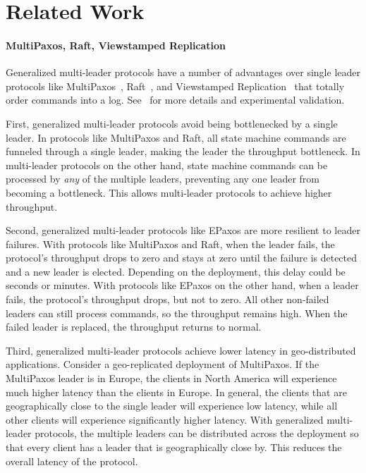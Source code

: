\section{Related Work}
\newcommand{\condensedparagraph}[1]{\textbf{#1}\;}

\paragraph{MultiPaxos, Raft, Viewstamped Replication}

Generalized multi-leader protocols have a number of advantages over single
leader protocols like MultiPaxos~\cite{lamport2001paxos},
Raft~\cite{ongaro2014search}, and Viewstamped
Replication~\cite{liskov2012viewstamped} that totally order commands into a
log. See~\cite{moraru2013there} for more details and experimental validation.

First, generalized multi-leader protocols avoid being bottlenecked by a single
leader. In protocols like MultiPaxos and Raft, all state machine commands are
funneled through a single leader, making the leader the throughput bottleneck.
In multi-leader protocols on the other hand, state machine commands can be
processed by \emph{any} of the multiple leaders, preventing any one leader from
becoming a bottleneck. This allows multi-leader protocols to achieve higher
throughput.

Second, generalized multi-leader protocols like EPaxos are more resilient to
leader failures. With protocols like MultiPaxos and Raft, when the leader
fails, the protocol's throughput drops to zero and stays at zero until the
failure is detected and a new leader is elected. Depending on the deployment,
this delay could be seconds or minutes. With protocols like EPaxos on the other
hand, when a leader fails, the protocol's throughput drops, but not to zero.
All other non-failed leaders can still process commands, so the throughput
remains high. When the failed leader is replaced, the throughput returns to
normal.

Third, generalized multi-leader protocols achieve lower latency in
geo-distributed applications. Consider a geo-replicated deployment of
MultiPaxos. If the MultiPaxos leader is in Europe, the clients in North America
will experience much higher latency than the clients in Europe. In general, the
clients that are geographically close to the single leader will experience low
latency, while all other clients will experience significantly higher latency.
With generalized multi-leader protocols, the multiple leaders can be
distributed across the deployment so that every client has a leader that is
geographically close by. This reduces the overall latency of the protocol.

